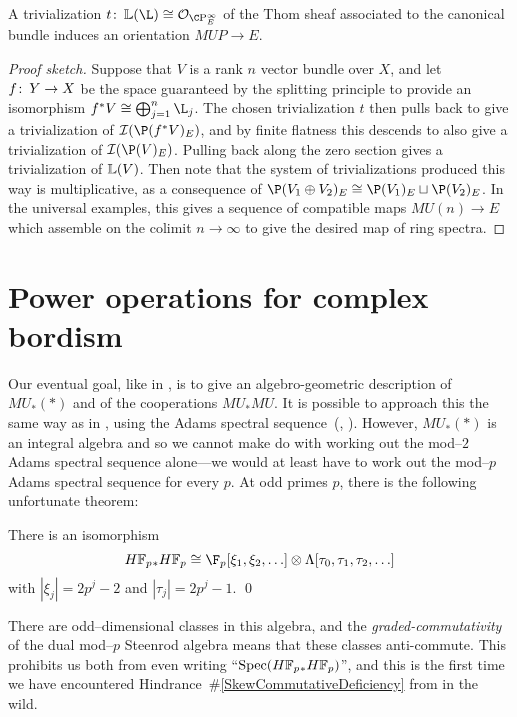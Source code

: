 \begin{theorem}\label{ComplexOrientationsInTermsOfTrivs}
A trivialization \(t\co \ThomSheaf{\L} \cong \sheaf O_{\CP^\infty_E}\) of the Thom sheaf associated to the canonical bundle induces an orientation \(MUP \to E\).
\end{theorem}
\begin{proof}[Proof sketch]
Suppose that \(V\) is a rank \(n\) vector bundle over \(X\), and let \(f\colon\thinspace Y \to X\) be the space guaranteed by the splitting principle to provide an isomorphism \(f^* V \cong \bigoplus_{j=1}^n \L_j\).  The chosen trivialization \(t\) then pulls back to give a trivialization of \(\sheaf I(\P(f^* V)_E)\), and by finite flatness this descends to also give a trivialization of \(\sheaf I(\P(V)_E)\).  Pulling back along the zero section gives a trivialization of \(\mathbb{L}(V)\).  Then note that the system of trivializations produced this way is multiplicative, as a consequence of \(\P(V_1 \oplus V_2)_E \cong \P(V_1)_E \sqcup \P(V_2)_E\).  In the universal examples, this gives a sequence of compatible maps \(MU(n) \to E\) which assemble on the colimit \(n \to \infty\) to give the desired map of ring spectra.
\end{proof}










\section{Power operations for complex bordism}\label{QuillenPowerOpnsSection}

Our eventual goal, like in , is to give an algebro-geometric description of \(MU_*(*)\) and of the cooperations \(MU_* MU\).  It is possible to approach this the same way as in , using the Adams spectral sequence~(\cite[Theorem 2]{QuillenAdamsSS}, \cite[Lecture 9]{LurieChromaticCourseNotes}).  However, \(MU_*(*)\) is an integral algebra and so we cannot make do with working out the mod--\(2\) Adams spectral sequence alone---we would at least have to work out the mod--\(p\) Adams spectral sequence for every \(p\).  At odd primes \(p\), there is the following unfortunate theorem:
\begin{theorem}
There is an isomorphism
\[\HFp_* \HFp \cong \F_p[\xi_1, \xi_2, \ldots] \otimes \Lambda[\tau_0, \tau_1, \tau_2, \ldots]\]
with \(|\xi_j| = 2p^j-2\) and \(|\tau_j| = 2p^j - 1\). \qed
\end{theorem}
\noindent There are odd--dimensional classes in this algebra, and the \emph{graded-commutativity} of the dual mod--\(p\) Steenrod algebra means that these classes anti-commute.  This prohibits us both from even writing ``\(\Spec(\HFp_* \HFp)\)'', and this is the first time we have encountered Hindrance~\#\ref{SkewCommutativeDeficiency} from  in the wild.

